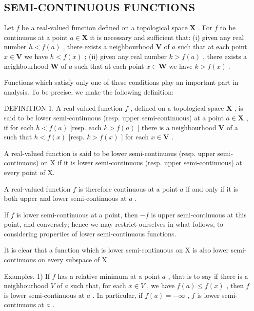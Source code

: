 \subsection{SEMI-CONTINUOUS FUNCTIONS}

Let \(f\) be a real-valued function defined on a topological space \(\mathbf{X}\) . For \(f\) to be continuous at a point \(a \in \mathbf{X}\) it is necessary and sufficient that: (i) given any real number \(h < f(a)\) , there exists a neighbourhood \(\mathbf{V}\) of \(a\) such that at each point \(x \in \mathbf{V}\) we have \(h < f(x)\) ; (ii) given any real number \(k > f(a)\) , there exists a neighbourhood \(\mathbf{W}\) of \(a\) such that at each point \(x \in \mathbf{W}\) we have \(k > f(x)\) .

Functions which satisfy only one of these conditions play an important part in analysis. To be precise, we make the following definition:

DEFINITION 1. A real-valued function \(f\) , defined on a topological space \(\mathbf{X}\) , is said to be lower semi-continuous (resp. upper semi-continuous) at a point \(a \in \mathbf{X}\) , if for each \(h < f(a)\) {[}resp. each \(k > f(a)\) {]} there is a neighbourhood \(\mathbf{V}\) of a such that \(h < f(x)\) {[}resp. \(k > f(x)\) {]} for each \(x \in \mathbf{V}\) .

A real-valued function is said to be lower semi-continuous (resp. upper semi-continuous) on X if it is lower semi-continuous (resp. upper semi-continuous) at every point of X.

A real-valued function \(f\) is therefore continuous at a point \(a\) if and only if it is both upper and lower semi-continuous at \(a\) .

If \(f\) is lower semi-continuous at a point, then \(-f\) is upper semi-continuous at this point, and conversely; hence we may restrict ourselves in what follows, to considering properties of lower semi-continuous functions.

It is clear that a function which is lower semi-continuous on X is also lower semi-continuous on every subspace of X.

Examples. 1) If \(f\) has a relative minimum at a point \(a\) , that is to say if there is a neighbourhood \(V\) of \(a\) such that, for each \(x \in V\) , we have \(f(a) \leqslant f(x)\) , then \(f\) is lower semi-continuous at \(a\) . In particular, if \(f(a) = -\infty\) , \(f\) is lower semi-continuous at \(a\) .

